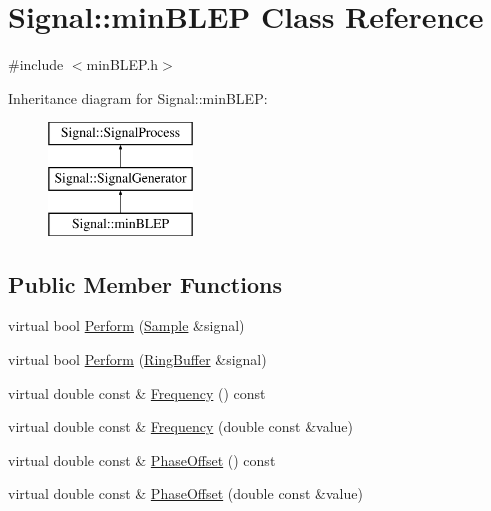 \hypertarget{class_signal_1_1min_b_l_e_p}{\section{Signal\+:\+:min\+B\+L\+E\+P Class Reference}
\label{class_signal_1_1min_b_l_e_p}
}


{\ttfamily \#include $<$min\+B\+L\+E\+P.\+h$>$}

Inheritance diagram for Signal\+:\+:min\+B\+L\+E\+P\+:\begin{figure}[H]
\begin{center}
\leavevmode
\includegraphics[height=3.000000cm]{class_signal_1_1min_b_l_e_p}
\end{center}
\end{figure}
\subsection*{Public Member Functions}
\begin{DoxyCompactItemize}
\item 
virtual bool \hyperlink{class_signal_1_1_signal_generator_a2cd9061c5ae40a392a9476551b4379f3}{Perform} (\hyperlink{class_signal_1_1_sample}{Sample} \&signal)
\item 
virtual bool \hyperlink{class_signal_1_1_signal_generator_a126d52dd9b6b14d33efc624e2c89284e}{Perform} (\hyperlink{class_signal_1_1_ring_buffer}{Ring\+Buffer} \&signal)
\item 
virtual double const \& \hyperlink{class_signal_1_1_signal_generator_a96af42ee68f94e9b04d034fd68b73ecd}{Frequency} () const 
\item 
virtual double const \& \hyperlink{class_signal_1_1_signal_generator_af83b532bf3ddc3637c2fd7a1dfd095cb}{Frequency} (double const \&value)
\item 
virtual double const \& \hyperlink{class_signal_1_1_signal_generator_ac2538ec946f001e394d2416fda698d1c}{Phase\+Offset} () const 
\item 
virtual double const \& \hyperlink{class_signal_1_1_signal_generator_ac6a103ff72beaa338f6d18c812522d78}{Phase\+Offset} (double const \&value)
\end{DoxyCompactItemize}
